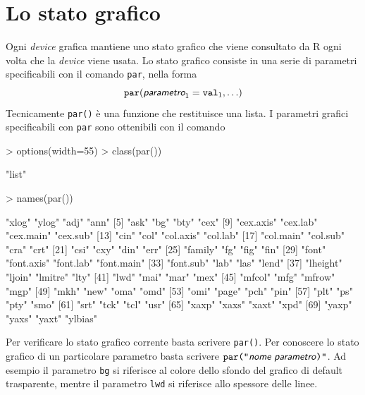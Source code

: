 \documentclass[onecolumn,11pt]{book}
\newcommand{\varia}[1]{\textsl{\textsf{#1}}}
\begin{document}
\section{Lo stato grafico}
Ogni \emph{device} grafica mantiene uno stato grafico che viene consultato da \textsf{R} ogni volta che la \emph{device} viene usata. Lo stato grafico consiste in una serie di parametri specificabili con il comando \texttt{par}, nella forma
\begin{equation*}\texttt{par}(\varia{parametro}_1=\texttt{val}_1,\ldots)
\end{equation*}
Tecnicamente \texttt{par()} \`e una funzione  che restituisce una lista.
I parametri grafici specificabili con \texttt{par} sono ottenibili con il comando 
\begin{Schunk}
\begin{Sinput}
> options(width=55)
> class(par())
\end{Sinput}
\begin{Soutput}
[1] "list"
\end{Soutput}
\begin{Sinput}
> names(par())
\end{Sinput}
\begin{Soutput}
 [1] "xlog"      "ylog"      "adj"       "ann"      
 [5] "ask"       "bg"        "bty"       "cex"      
 [9] "cex.axis"  "cex.lab"   "cex.main"  "cex.sub"  
[13] "cin"       "col"       "col.axis"  "col.lab"  
[17] "col.main"  "col.sub"   "cra"       "crt"      
[21] "csi"       "cxy"       "din"       "err"      
[25] "family"    "fg"        "fig"       "fin"      
[29] "font"      "font.axis" "font.lab"  "font.main"
[33] "font.sub"  "lab"       "las"       "lend"     
[37] "lheight"   "ljoin"     "lmitre"    "lty"      
[41] "lwd"       "mai"       "mar"       "mex"      
[45] "mfcol"     "mfg"       "mfrow"     "mgp"      
[49] "mkh"       "new"       "oma"       "omd"      
[53] "omi"       "page"      "pch"       "pin"      
[57] "plt"       "ps"        "pty"       "smo"      
[61] "srt"       "tck"       "tcl"       "usr"      
[65] "xaxp"      "xaxs"      "xaxt"      "xpd"      
[69] "yaxp"      "yaxs"      "yaxt"      "ylbias"   
\end{Soutput}
\end{Schunk}
Per verificare lo stato grafico corrente basta scrivere \texttt{par()}. Per conoscere lo stato grafico di un particolare parametro basta scrivere $\texttt{par("\varia{nome parametro})"}$.
Ad esempio il parametro \texttt{bg} si riferisce al colore dello sfondo del grafico di default trasparente, mentre il parametro \texttt{lwd} si riferisce allo spessore delle linee.
\end{document}
